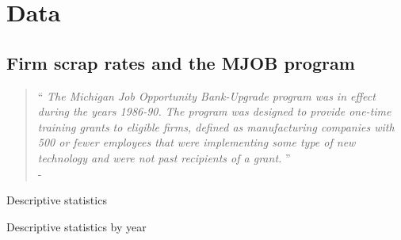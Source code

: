 \section{Data}
\label{s:data}

\subsection{Firm scrap rates and the MJOB program}
\label{s:data_descriptive}
\begin{quote}
    \enquote{
        \textit{The Michigan Job Opportunity Bank-Upgrade program was in effect during the years 1986-90. The program was designed to provide one-time training grants to eligible firms, defined as manufacturing companies with 500 or fewer employees that were implementing some type of new technology and were not past recipients of a grant.}
    }\\
    \null\hfill - \citet{holzer1993training}
\end{quote}

\begin{table}
    \centering
    \caption{Descriptive statistics}
    \label{t:descriptive}
    
\end{table}

\begin{table}
    \centering
    \caption{Descriptive statistics by year}
    \label{t:descriptive_yearly}
    
\end{table}
